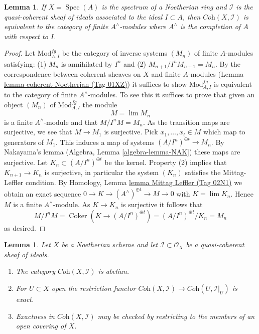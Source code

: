 \documentclass{amsart}
\theoremstyle{plain}
\newtheorem{lemma}[subsection]{Lemma}
\theoremstyle{definition}
\theoremstyle{remark}
\numberwithin{equation}{subsection}
\def\lim{\mathop{\mathrm{lim}}\nolimits}
\def\Spec{\mathop{\mathrm{Spec}}}
\def\Coker{\mathop{\mathrm{Coker}}}
\begin{document}
\begin{lemma}
\label{lemma-inverse-systems-affine}
If $X = \Spec(A)$ is the spectrum of a Noetherian ring and
$\mathcal{I}$ is the quasi-coherent sheaf of ideals associated to the ideal
$I \subset A$, then $\textit{Coh}(X, \mathcal{I})$ is equivalent to the
category of finite $A^\wedge$-modules where $A^\wedge$ is the completion
of $A$ with respect to $I$.
\end{lemma}

\begin{proof}
Let $\text{Mod}^{fg}_{A, I}$ be the category of inverse systems $(M_n)$
of finite $A$-modules satisfying: (1) $M_n$ is annihilated by $I^n$ and (2)
$M_{n + 1}/I^nM_{n + 1} = M_n$. By the correspondence between coherent
sheaves on $X$ and finite $A$-modules (Lemma \href{https://stacks.math.columbia.edu/tag/01XZ}{lemma coherent Noetherian (Tag 01XZ)})
it suffices to show $\text{Mod}^{fg}_{A, I}$ is equivalent to the category of
finite $A^\wedge$-modules. To see this it suffices to prove that given
an object $(M_n)$ of $\text{Mod}^{fg}_{A, I}$ the module
$$
M = \lim M_n
$$
is a finite $A^\wedge$-module and that $M/I^nM = M_n$. As the transition
maps are surjective, we see that $M \to M_1$ is surjective.
Pick $x_1, \ldots, x_t \in M$ which map to generators of $M_1$.
This induces a map of systems $(A/I^n)^{\oplus t} \to M_n$.
By Nakayama's lemma (Algebra, Lemma \ref{algebra-lemma-NAK}) these maps are
surjective. Let $K_n \subset (A/I^n)^{\oplus t}$ be the kernel.
Property (2) implies that $K_{n + 1} \to K_n$ is surjective, in particular
the system $(K_n)$ satisfies the Mittag-Leffler condition.
By Homology, Lemma \href{https://stacks.math.columbia.edu/tag/02N1}{lemma Mittag Leffler (Tag 02N1)}
we obtain an exact sequence
$0 \to K \to (A^\wedge)^{\oplus t} \to M \to 0$
with $K = \lim K_n$.
Hence $M$ is a finite $A^\wedge$-module.
As $K \to K_n$ is surjective it follows that
$$
M/I^nM = \Coker(K \to (A/I^n)^{\oplus t}) =
(A/I^n)^{\oplus t}/K_n = M_n
$$
as desired.
\end{proof}


\begin{lemma}
\label{lemma-inverse-systems-abelian}
Let $X$ be a Noetherian scheme and let $\mathcal{I} \subset \mathcal{O}_X$
be a quasi-coherent sheaf of ideals.
\begin{enumerate}
\item The category $\textit{Coh}(X, \mathcal{I})$ is abelian.
\item For $U \subset X$ open the restriction functor
$\textit{Coh}(X, \mathcal{I}) \to \textit{Coh}(U, \mathcal{I}|_U)$
is exact.
\item Exactness in $\textit{Coh}(X, \mathcal{I})$ may be checked by
restricting to the members of an open covering of $X$.
\end{enumerate}
\end{lemma}
\end{document}
